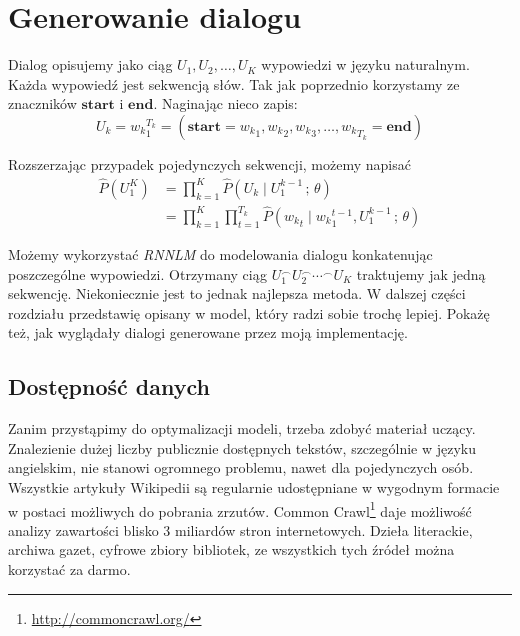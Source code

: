 
\setlength{\abovedisplayskip}{20pt}
\setlength{\belowdisplayskip}{20pt}

\chapter{Generowanie dialogu}\label{rozdzial3}

Dialog opisujemy jako ciąg $U_1, U_2, \dots, U_K$ wypowiedzi w języku naturalnym. Każda wypowiedź jest sekwencją słów. Tak jak poprzednio korzystamy ze znaczników $\mathbf{start}$ i $\mathbf{end}$. Naginając nieco zapis:
\[U_k = {w_k}_1^{T_k} = (\mathbf{start}={w_k}_1, {w_k}_2, {w_k}_3, \dots, {w_k}_{T_k}=\mathbf{end})\]

\noindent
Rozszerzając przypadek pojedynczych sekwencji, możemy napisać
\[
\begin{aligned}
\hat{P}(U_1^K) &= \prod\limits_{k=1}^K \hat{P}(U_k \mid U_1^{k-1}\, ;\, \theta)\\
               &= \prod\limits_{k=1}^K \prod\limits_{t=1}^{T_k}
                  \hat{P}({w_k}_t \mid {w_k}_1^{t-1}, U_1^{k-1}\, ;\, \theta)
\end{aligned}
\]

Możemy wykorzystać \textit{RNNLM} do modelowania dialogu konkatenując poszczególne wypowiedzi. Otrzymany ciąg $U_1^\frown U_2^\frown \cdots^\frown U_K$ traktujemy jak jedną sekwencję. Niekoniecznie jest to jednak najlepsza metoda. W dalszej części rozdziału przedstawię opisany w \cite{serbanhred} model, który radzi sobie trochę lepiej. Pokażę też, jak wyglądały dialogi generowane przez moją implementację.


\section{Dostępność danych}

Zanim przystąpimy do optymalizacji modeli, trzeba zdobyć materiał uczący. Znalezienie dużej liczby publicznie dostępnych tekstów, szczególnie w języku angielskim, nie stanowi ogromnego problemu, nawet dla pojedynczych osób. Wszystkie artykuły Wikipedii są regularnie udostępniane w wygodnym formacie w postaci możliwych do pobrania zrzutów. Common Crawl\footnote{\url{http://commoncrawl.org/}} daje możliwość analizy zawartości blisko 3 miliardów stron internetowych. Dzieła literackie, archiwa gazet, cyfrowe zbiory bibliotek, ze wszystkich tych źródeł można korzystać za darmo.


